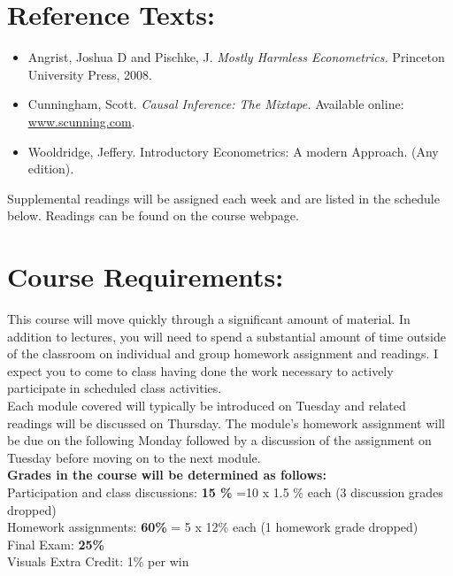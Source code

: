 \documentclass[a4paper, 10pt]{article}
\begin{document}
\section*{Reference Texts:}
\begin{itemize}
\item \normalsize Angrist, Joshua D and Pischke, J. \textit{Mostly Harmless Econometrics.} Princeton University Press, 2008. \\
\item \normalsize Cunningham, Scott. \textit{Causal Inference: The Mixtape.} Available online: \href{www.scunning.com}{www.scunning.com}.\\
\item \normalsize Wooldridge, Jeffery. Introductory Econometrics: A modern Approach. (Any edition). \\
\end{itemize}

\noindent Supplemental readings will be assigned each week and are listed in the schedule below. Readings can be found on the course webpage.\\

\section*{Course Requirements:}

This course will move quickly through a significant amount of material. In addition to lectures, you will need to spend a substantial amount of time outside of the classroom on individual and group homework assignment and readings. I expect you to come to class having done the work necessary to actively participate in scheduled class activities. \\

\noindent Each module covered will typically be introduced on Tuesday and related readings will be discussed on Thursday. The module's homework assignment will be due on the following Monday followed by a discussion of the assignment on Tuesday before moving on to the next module. \\

\noindent \textbf{Grades in the course will be determined as follows:}\\
\noindent Participation and class discussions: \textbf{15 \%} =10 x 1.5 \% each (3 discussion grades dropped)\\
Homework assignments: \textbf{60\%} = 5 x 12\% each (1 homework grade dropped)\\
Final Exam: \textbf{25\%}\\
Visuals Extra Credit: 1\% per win\\ 
\end{document}
